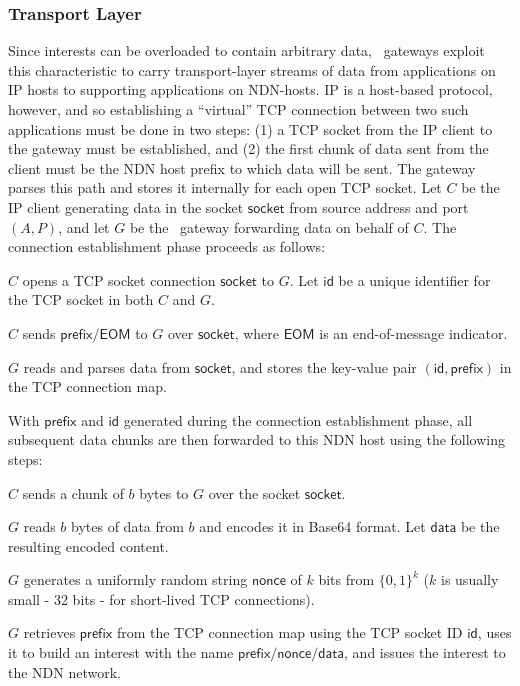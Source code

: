 \subsubsection{Transport Layer} %
Since interests can be overloaded to contain arbitrary data, \sink\ gateways exploit this characteristic to carry transport-layer streams of data from applications on IP hosts to supporting applications on NDN-hosts. IP is a host-based protocol, however, and so establishing a ``virtual'' TCP connection between two such applications must be done in two steps: (1) a TCP socket from the IP client to the gateway must be established, and (2) the first chunk of data sent from the client must be the NDN host prefix to which data will be sent. The gateway parses this path and stores it internally for each open TCP socket. Let $C$ be the IP client generating data in the socket $\mathsf{socket}$ from source address and port $(A, P)$, and let $G$ be the \sink\ gateway forwarding data on behalf of $C$. The connection establishment phase proceeds as follows:
%
\begin{compactenum}
	\item $C$ opens a TCP socket connection $\mathsf{socket}$ to $G$. Let $\mathsf{id}$ be a unique identifier for the TCP socket in both $C$ and $G$.
	\item $C$ sends $\mathsf{prefix}/\mathsf{EOM}$ to $G$ over $\mathsf{socket}$, where $\mathsf{EOM}$ is an end-of-message indicator.
	\item $G$ reads and parses data from $\mathsf{socket}$, and stores the key-value pair $(\mathsf{id}, \mathsf{prefix})$ in the TCP connection map.
\end{compactenum}
%
With $\mathsf{prefix}$ and $\mathsf{id}$ generated during the connection establishment phase, all subsequent data chunks are then forwarded to this NDN host using the following steps:
%
\begin{compactenum}
	\item $C$ sends a chunk of $b$ bytes to $G$ over the socket $\mathsf{socket}$.
	\item $G$ reads $b$ bytes of data from $b$ and encodes it in Base64 format. Let $\mathsf{data}$ be the resulting encoded content.
	\item $G$ generates a uniformly random string $\mathsf{nonce}$ of $k$ bits from $\{0,1\}^k$ ($k$ is usually small - 32 bits - for short-lived TCP connections). 
	\item $G$ retrieves $\mathsf{prefix}$ from the TCP connection map using the TCP socket ID $\mathsf{id}$, uses it to build an interest with the name $\mathsf{prefix}/\mathsf{nonce}/\mathsf{data}$, and issues the interest to the NDN network.
\end{compactenum}
